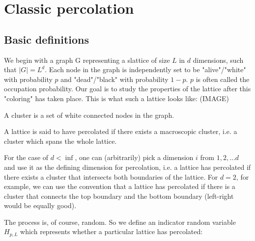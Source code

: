 
\chapter{Classic percolation}

\label{ch:classicpercolation} %



\section{Basic definitions}

We begin with a graph G representing a slattice of size $L$ in $d$ dimensions, such that $|G| = L^d$.
Each node in the graph is independently set to be "alive"/"white" with probability $p$ and "dead"/"black" with probability $1-p$. $p$ is often called the occupation probability.
Our goal is to study the properties of the lattice after this "coloring" has taken place. This is what such a lattice looks like: (IMAGE)


\begin{defn}
A cluster is a set of white connected nodes in the graph.
\end{defn}


\begin{defn}
A lattice is said to have percolated if there exists a macroscopic cluster, i.e. a cluster which spans the whole lattice.
\end{defn}

For the case of $d<\inf$, one can (arbitrarily) pick a dimension $i$ from ${1, 2, ... d}$ and use it as the defining dimension for percolation, i.e. a lattice has percolated if there exists a cluster that intersects both boundaries of the lattice. For $d=2$, for example, we can use the convention that a lattice has percolated if there is a cluster that connects the top boundary and the bottom boundary (left-right would be equally good).

The process is, of course, random. So we define an indicator random variable $H_{p,L}$ which represents whether a particular lattice has percolated:

